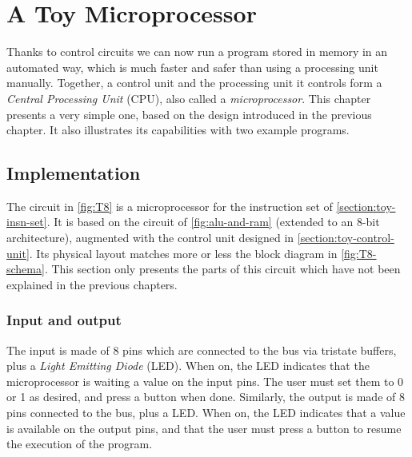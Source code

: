 
\renewcommand{\rustfile}{chapter5}
\setcounter{rustid}{0}

\chapter{A Toy Microprocessor}\label{chapter:toy-microprocessor}

Thanks to control circuits we can now run a program stored in memory in an
automated way, which is much faster and safer than using a processing unit
manually. Together, a control unit and the processing unit it controls form a
{\em Central Processing Unit} (CPU), also called a {\em microprocessor}. This
chapter presents a very simple one, based on the design introduced in the
previous chapter. It also illustrates its capabilities with two example
programs.

\section{Implementation}

The circuit in \cref{fig:T8} is a microprocessor for the instruction set of
\cref{section:toy-insn-set}. It is based on the circuit of
\cref{fig:alu-and-ram} (extended to an 8-bit architecture), augmented with the
control unit designed in \cref{section:toy-control-unit}. Its physical layout
matches more or less the block diagram in \cref{fig:T8-schema}. This section
only presents the parts of this circuit which have not been explained in the
previous chapters.

\subsection{Input and output}

The input is made of 8 pins which are connected to the bus via tristate
buffers, plus a {\em Light Emitting Diode} (LED). When on, the LED indicates
that the microprocessor is waiting a value on the input pins. The user must set
them to 0 or 1 as desired, and press a button when done. Similarly, the output
is made of 8 pins connected to the bus, plus a LED. When on, the LED indicates
that a value is available on the output pins, and that the user must press a
button to resume the execution of the program.

